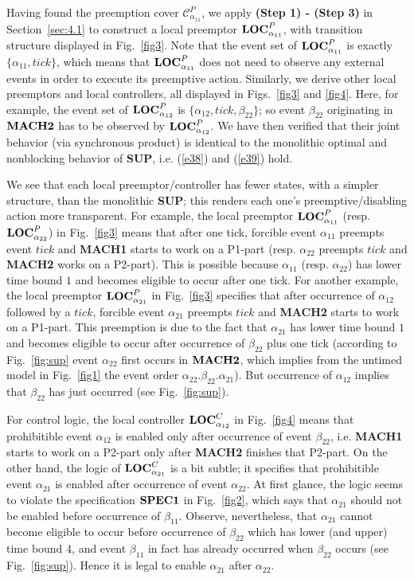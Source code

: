 \documentclass[twocolumn]{autart}
\begin{document}
Having found the preemption cover $\mathcal {C}^P_{\alpha_{11}}$, we
apply \textbf{(Step 1) - (Step 3)} in Section~\ref{sec:4.1} to
construct a local preemptor ${\bf LOC}^P_{\alpha_{11}}$, with
transition structure displayed in Fig.~\ref{fig3}. Note that the
event set of ${\bf LOC}^P_{\alpha_{11}}$ is exactly $\{\alpha_{11},
tick\}$, which means that ${\bf LOC}^P_{\alpha_{11}}$ does not need
to observe any external events in order to execute its preemptive action.
Similarly, we derive other local preemptors and local
controllers, all displayed in Figs.~\ref{fig3} and \ref{fig4}. Here,
for example, the event set of ${\bf LOC}^P_{\alpha_{12}}$ is
$\{\alpha_{12}, tick, \beta_{22}\}$; so event $\beta_{22}$ originating in
$\bf MACH2$ has to be observed by ${\bf LOC}^P_{\alpha_{12}}$. We
have then verified that their joint behavior (via synchronous
product) is identical to the monolithic optimal and nonblocking
behavior of {\bf SUP}, i.e. (\ref{e38}) and (\ref{e39}) hold.

We see that each local preemptor/controller has fewer states, with a
simpler structure, than the monolithic {\bf SUP}; this renders each
one's preemptive/disabling action more transparent.  For example,
the local preemptor ${\bf LOC}^P_{\alpha_{11}}$ (resp. ${\bf
LOC}^P_{\alpha_{22}}$) in Fig.~\ref{fig3} means that after one tick,
forcible event $\alpha_{11}$ preempts event $tick$ and {\bf MACH1}
starts to work on a P1-part (resp. $\alpha_{22}$ preempts $tick$ and
{\bf MACH2} works on a P2-part).  This is possible because
$\alpha_{11}$ (resp. $\alpha_{22}$) has lower time bound $1$ and
becomes eligible to occur after one tick. For another example, the
local preemptor ${\bf LOC}^P_{\alpha_{21}}$ in Fig.~\ref{fig3}
specifies that after occurrence of $\alpha_{12}$ followed by a
$tick$, forcible event $\alpha_{21}$ preempts $tick$ and {\bf MACH2}
starts to work on a P1-part. This preemption is due to the fact that
$\alpha_{21}$ has lower time bound $1$ and becomes eligible to occur
after occurrence of $\beta_{22}$ plus one tick
(according to Fig.~\ref{fig:sup} event $\alpha_{22}$ first occurs in
$\bf MACH2$, which implies from the untimed model in Fig.~\ref{fig1}
the event order $\alpha_{22}.\beta_{22}.\alpha_{21}$). But
occurrence of $\alpha_{12}$ implies that $\beta_{22}$ has just
occurred (see Fig.~\ref{fig:sup}).

For control logic, the local controller ${\bf LOC}^C_{\alpha_{12}}$
in Fig.~\ref{fig4} means that prohibitible event $\alpha_{12}$ is
enabled only after occurrence of event $\beta_{22}$, i.e. {\bf
MACH1} starts to work on a P2-part only after {\bf MACH2} finishes
that P2-part. On the other hand, the logic of ${\bf
LOC}^C_{\alpha_{21}}$ is a bit subtle; it specifies that
prohibitible event $\alpha_{21}$ is enabled after occurrence of
event $\alpha_{22}$.  At first glance, the logic seems to violate
the specification $\bf SPEC1$ in Fig.~\ref{fig2}, which says that
$\alpha_{21}$ should not be enabled before occurrence of
$\beta_{11}$. Observe, nevertheless, that $\alpha_{21}$ cannot
become eligible to occur before occurrence of $\beta_{22}$ which has
lower (and upper) time bound $4$, and event $\beta_{11}$ in fact has
already occurred when $\beta_{22}$ occurs (see Fig.~\ref{fig:sup}).
Hence it is legal to enable $\alpha_{21}$ after $\alpha_{22}$.
\end{document}
